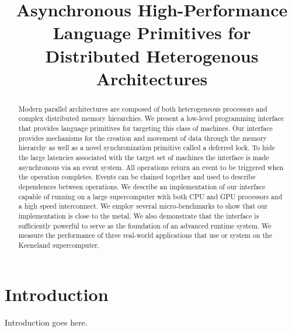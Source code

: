 \documentclass{sig-alternate}
\begin{document}
\title{Asynchronous High-Performance Language Primitives for Distributed Heterogenous Architectures}
\author{}
\maketitle

\begin{abstract}
Modern parallel architectures are composed of both heterogeneous processors
and complex distributed memory hierarchies.  We present a low-level programming
interface that provides language primitives for targeting this class of
machines.  Our interface provides mechanisms for the creation and movement
of data through the memory hierarchy as well as a novel synchronization primitive 
called a deferred lock.  To hide the large latencies associated with the target
set of machines the interface is made asynchronous via an event system.  All
operations return an event to be triggered when the operation completes.  Events
can be chained together and used to describe dependences between operations.
We describe an implementation of our interface capable of running on
a large supercomputer with both CPU and GPU processors and a high speed interconnect.
We employ several micro-benchmarks to show that our implementation is close to the metal.
We also demonstrate that the interface is sufficiently powerful to serve as the foundation 
of an advanced runtime system.  We measure the performance of three real-world applications
that use or system on the Keeneland supercomputer.
\end{abstract}

\section{Introduction}
\label{sect:intro}
Introduction goes here.





{
\small

}
\end{document}
